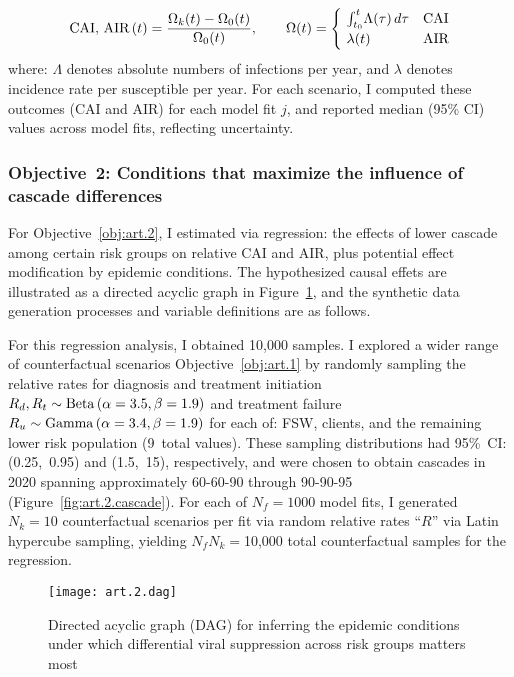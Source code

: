\begin{equation}
  \textnormal{CAI, AIR}\,(t) = \frac{\Omega_{k}(t) - \Omega_{0}(t)}{\Omega_{0}(t)}
  ,\qquad \Omega(t) =
  \begin{cases}
    ~\int_{t_0}^{t}\!\Lambda(\tau)\,d\tau & \textnormal{CAI} \\
    ~\lambda(t) & \textnormal{AIR}
  \end{cases}
\end{equation} where:
$\Lambda$ denotes absolute numbers of infections per year, and
$\lambda$ denotes incidence rate per susceptible per year.
For each scenario, I computed these outcomes (CAI and AIR) for each model fit $j$,
and reported median (95\% CI) values across model fits, reflecting uncertainty.
\subsubsection{Objective~2: Conditions that maximize the influence of cascade differences}\label{art.meth.obj.2}
For Objective~\ref{obj:art.2}, I estimated via regression:
the effects of lower cascade among certain risk groups on relative CAI and AIR,
plus potential effect modification by epidemic conditions.
The hypothesized causal effets are illustrated
as a directed acyclic graph in Figure~\ref{fig:art.2.dag},
and the synthetic data generation processes and variable definitions are as follows.
\par
For this regression analysis, I obtained 10,000 samples.
I explored a wider range of counterfactual scenarios \vs Objective~\ref{obj:art.1}
by randomly sampling the relative rates for
diagnosis and treatment initiation $R_d, R_t \sim \operatorname{Beta}\,(\alpha=3.5,\beta=1.9)$
and treatment failure $R_u \sim \operatorname{Gamma}\,(\alpha=3.4,\beta=1.9)$
for each of: FSW, clients, and the remaining lower risk population (9~total values).
These sampling distributions had 95\%~CI: (0.25,~0.95) and (1.5,~15), respectively,
and were chosen to obtain cascades in 2020 spanning
approximately \mbox{60-60-90} through \mbox{90-90-95} (Figure~\ref{fig:art.2.cascade}). %
For each of $N_f = 1000$ model fits, I generated $N_k = 10$ counterfactual scenarios per fit
via random relative rates ``$R$'' via Latin hypercube sampling,
yielding $N_f N_k = {}$10,000 total counterfactual samples for the regression.
\begin{figure}
  \centering\texttt{[image: art.2.dag]}
  \caption{Directed acyclic graph (DAG) for inferring
    the epidemic conditions under which
    differential viral suppression across risk groups matters most}
  \label{fig:art.2.dag}
\end{figure}

